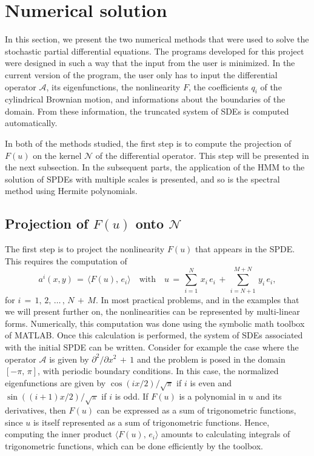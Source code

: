 \section{Numerical solution} 
\label{sec:Numerical solution}
In this section, we present the two numerical methods that were used to
solve the stochastic partial differential equations. The programs developed for
this project were designed in such a way that the input from the user is
minimized. In the current version of the program, the user only has to input
the differential operator $\mathcal A$, its eigenfunctions, the nonlinearity
$F$, the coefficients $q_i$ of the cylindrical Brownian motion, and
informations about the boundaries of the domain. From these information, the
truncated system of SDEs is computed automatically.

In both of the methods studied, the first step is to compute the projection of $F(u)$
on the kernel $\mathcal N$ of the differential operator. This step will be presented
in the next subsection. In the subsequent parts, the application of the HMM to
the solution of SPDEs with multiple scales is presented, and so is the spectral
method using Hermite polynomials.

\subsection{Projection of $F(u)$ onto $\mathcal N$}
\label{sub:Projection of F(u) on  N}
The first step is to project the nonlinearity $F(u)$ that appears in the SPDE.
This requires the computation of
$$
a^i(x,y) \,=\, \langle F(u),\, e_i\rangle \quad
\text{with} \quad u \,=\, \sum^{N}_{i=1} \, x_i \, e_i \,+\,
\sum^{M+N}_{i=N+1}\, y_i \, e_i,
$$
for $i \,=\, 1,\,2,\,{\dots}\,,\, N \,+\, M$. In most practical problems, and in the examples
that we will present further on,  the nonlinearities can be represented by
multi-linear forms.  Numerically, this computation was done using the symbolic
math toolbox of MATLAB. Once this calculation is performed, the system of SDEs
associated with the initial SPDE can be written. Consider for example the case
where the operator $\mathcal A$ is given by ${\partial}^2/{\partial}x^2 \,+\,1$ and the problem
is posed in the domain $[-{\pi},\,{\pi}]$, with periodic boundary conditions. In this
case, the normalized eigenfunctions are given by $\cos(ix/2)/\sqrt{\pi}$ if $i$ is
even and $\sin((i+1)x/2)/\sqrt{\pi}$ if $i$ is odd. If $F(u)$ is a polynomial in
$u$ and its derivatives, then $F(u)$ can be expressed as a sum of trigonometric
functions, since $u$ is
itself
represented as a sum of trigonometric functions. Hence, computing the inner
product $\langle F(u),\, e_i \rangle$ amounts to calculating integrals of
trigonometric functions, which can be done efficiently by the toolbox.

